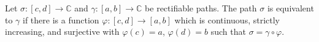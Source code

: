 Let $\sigma: [c, d] \to \mathbb{C}$ and $\gamma: [a, b] \to \mathbb{C}$ be rectifiable paths. The path $\sigma$ is equivalent to $\gamma$ if there is a function $\varphi: [c, d] \to [a, b]$ which is continuous, strictly increasing, and surjective with $\varphi(c) = a$, $\varphi(d) = b$ such that $\sigma = \gamma \circ \varphi$.
